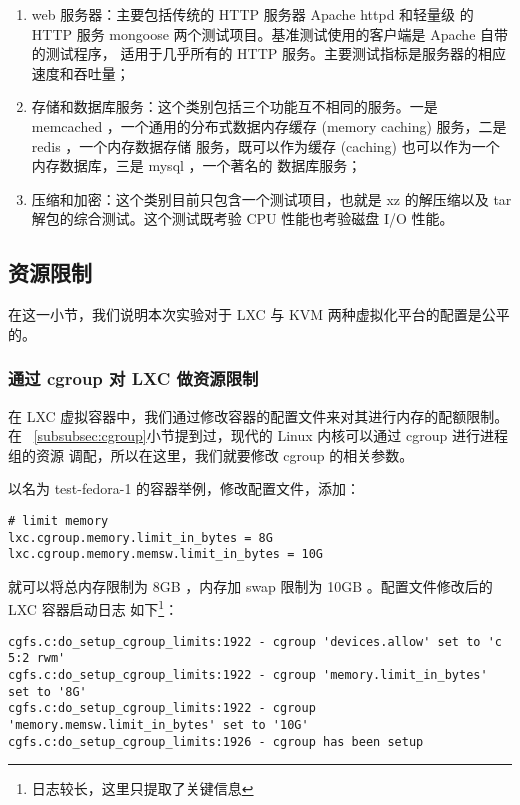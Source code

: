 \begin{enumerate}
    \item web 服务器：主要包括传统的 HTTP 服务器 Apache httpd 和轻量级
    的 HTTP 服务 mongoose 两个测试项目。基准测试使用的客户端是 Apache 自带的测试程序，
    适用于几乎所有的 HTTP 服务。主要测试指标是服务器的相应速度和吞吐量；
    \item 存储和数据库服务：这个类别包括三个功能互不相同的服务。一是 memcached
    ，一个通用的分布式数据内存缓存 (memory caching) 服务，二是 redis ，一个内存数据存储
    服务，既可以作为缓存 (caching) 也可以作为一个内存数据库，三是 mysql ，一个著名的
    数据库服务；
    \item 压缩和加密：这个类别目前只包含一个测试项目，也就是 xz 的解压缩以及
    tar 解包的综合测试。这个测试既考验 CPU 性能也考验磁盘 I/O 性能。
\end{enumerate}

\subsection{资源限制}

在这一小节，我们说明本次实验对于 LXC 与 KVM 两种虚拟化平台的配置是公平的。

\subsubsection{通过 cgroup 对 LXC 做资源限制}

在 LXC 虚拟容器中，我们通过修改容器的配置文件来对其进行内存的配额限制。在
~\ref{subsubsec:cgroup}小节提到过，现代的 Linux 内核可以通过 cgroup 进行进程组的资源
调配，所以在这里，我们就要修改 cgroup 的相关参数。

以名为 test-fedora-1 的容器举例，修改配置文件，添加：

\begin{lstlisting}
# limit memory
lxc.cgroup.memory.limit_in_bytes = 8G
lxc.cgroup.memory.memsw.limit_in_bytes = 10G
\end{lstlisting}

就可以将总内存限制为 8GB ，内存加 swap 限制为 10GB 。配置文件修改后的 LXC 容器启动日志
如下\footnote{日志较长，这里只提取了关键信息}：

\begin{lstlisting}
cgfs.c:do_setup_cgroup_limits:1922 - cgroup 'devices.allow' set to 'c 5:2 rwm'
cgfs.c:do_setup_cgroup_limits:1922 - cgroup 'memory.limit_in_bytes' set to '8G'
cgfs.c:do_setup_cgroup_limits:1922 - cgroup 'memory.memsw.limit_in_bytes' set to '10G'
cgfs.c:do_setup_cgroup_limits:1926 - cgroup has been setup
\end{lstlisting}

